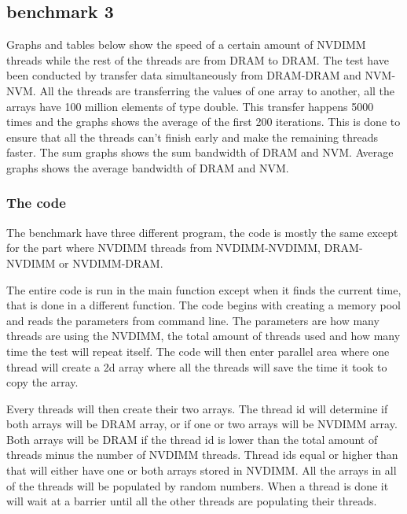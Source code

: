 \documentclass[12pt,a4paper,USenglish]{article}      %
\begin{document}
\subsection{benchmark 3}
Graphs and tables below show the speed of a certain amount of NVDIMM threads while the rest of the threads are from DRAM to DRAM.
The test have been conducted by transfer data simultaneously from DRAM-DRAM and NVM-NVM.
All the threads are transferring the values of one array to another, all the arrays have 100 million elements of type double. This transfer happens 5000 times and the graphs shows the average of the first 200 iterations. This is done to ensure that all the threads can't finish early and make the remaining threads faster. The sum graphs shows the sum bandwidth of DRAM and NVM. Average graphs shows the average bandwidth of DRAM and NVM.

\subsubsection{The code}
The benchmark have three different program, the code is mostly the same except for the part where NVDIMM threads from NVDIMM-NVDIMM, DRAM-NVDIMM or NVDIMM-DRAM. 

The entire code is run in the main function except when it finds the current time, that is done in a different function.
The code begins with creating a memory pool and reads the parameters from command line. The parameters are how many threads are using the NVDIMM, the total amount of threads used and how many time the test will repeat itself. 
The code will then enter parallel area where one thread will create a 2d array where all the threads will save the time it took to copy the array. 

Every threads will then create their two arrays. The thread id will determine if both arrays will be DRAM array, or if one or two arrays will be NVDIMM array. Both arrays will be DRAM if the thread id is lower than the total amount of threads minus the number of NVDIMM threads. Thread ids equal or higher than that will either have one or both arrays stored in NVDIMM. All the arrays in all of the threads will be populated by random numbers. When a thread is done it will wait at a barrier until all the other threads are populating their threads.
\end{document}
